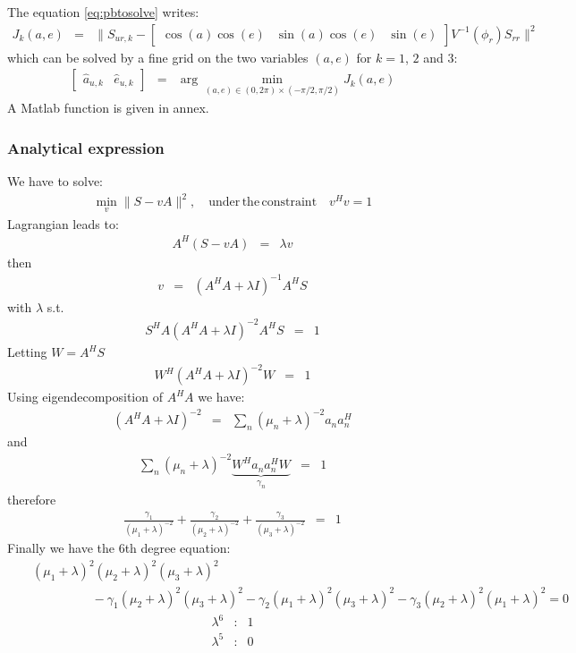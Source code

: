 \documentclass[a4paper, 12pt]{report}
\begin{document}
The equation \eqref{eq:pbtosolve} writes:
 \begin{eqnarray*}
J_{k}(a,e)&=&\| S_{ur,k} - \begin{bmatrix}
\cos(a)\cos(e)&\sin(a)\cos(e)&\sin(e)
\end{bmatrix}V^{-1}(\phi_{r})S_{rr}\|^{2}
 \end{eqnarray*}
 which can be solved by a fine grid on the two variables $(a,e)$ for $k=1$, $2$ and $3$:
 \begin{eqnarray*}
 \begin{bmatrix}
 \hat a_{u,k}& \hat e_{u,k}
 \end{bmatrix}
&=&\arg\min_{(a,e)\in(0,2\pi)\times(-\pi/2,\pi/2)}J_{k}(a,e)
 \end{eqnarray*}
 A Matlab function is given in annex.
 
 
 \subsubsection{Analytical expression}
 
We have to solve:
\begin{eqnarray*}
\min_{v} \| S - vA\|^{2}, \quad \mathrm{under\,the\,constraint}\quad v^{H}v=1
 \end{eqnarray*}
Lagrangian leads to:
\begin{eqnarray*}
A^{H}(S-vA)&=&\lambda v
\end{eqnarray*}
then
\begin{eqnarray*}
v&=&
(A^{H}A+\lambda I)^{-1}A^{H}S
\end{eqnarray*}
with $\lambda$ s.t.
\begin{eqnarray*}
S^{H}A(A^{H}A+\lambda I)^{-2}A^{H}S&=&1
\end{eqnarray*}
Letting $W=A^{H}S$
\begin{eqnarray*}
W^{H}(A^{H}A+\lambda I)^{-2}W&=&1
\end{eqnarray*}
Using eigendecomposition of $A^{H}A$ we have:
\begin{eqnarray}
(A^{H}A+\lambda I)^{-2}&=&\sum_{n}(\mu_{n}+\lambda)^{-2} a_{n}a_{n}^{H}
\end{eqnarray}
and 
\begin{eqnarray*}
\sum_{n}(\mu_{n}+\lambda)^{-2} \underbrace{W^{H}a_{n}a_{n}^{H}W}_{\gamma_{n}}&=&1
\end{eqnarray*}
therefore
\begin{eqnarray*}
\frac{\gamma_{1}}{(\mu_{1}+\lambda)^{-2}}
+\frac{\gamma_{2}}{(\mu_{2}+\lambda)^{-2}}
+\frac{\gamma_{3}}{(\mu_{3}+\lambda)^{-2}}&=&1
\end{eqnarray*}
Finally we have the 6th degree equation:
\begin{eqnarray*}
&&(\mu_{1}+\lambda)^{2}(\mu_{2}+\lambda)^{2}(\mu_{3}+\lambda)^{2}
\\
&&\hspace{2cm}
-\gamma_{1}(\mu_{2}+\lambda)^{2}(\mu_{3}+\lambda)^{2}
-\gamma_{2}(\mu_{1}+\lambda)^{2}(\mu_{3}+\lambda)^{2}
-\gamma_{3}(\mu_{2}+\lambda)^{2}(\mu_{1}+\lambda)^{2}
= 0
\end{eqnarray*}
\begin{eqnarray*}
\lambda^{6}&:&1
\\
\lambda^{5}&:&0
\end{eqnarray*}
\end{document}
